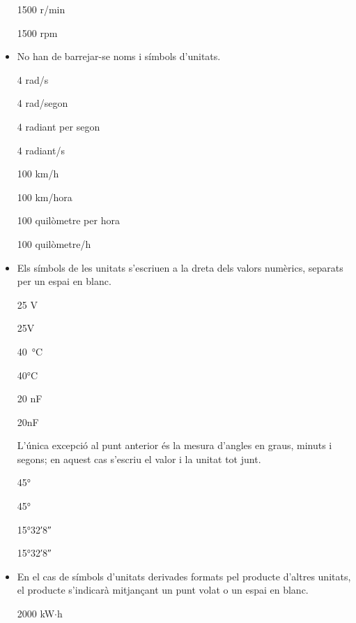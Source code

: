 \begin{itemize}
\textcolor{Green}\faCheckSquare{} 1500 r/min

\textcolor{Red}\faTimesCircle{} 1500 rpm

\item No han de barrejar-se noms i símbols d'unitats.

\textcolor{Green}\faCheckSquare{} 4 rad/s

\textcolor{Red}\faTimesCircle{} 4 rad/segon

\textcolor{Green}\faCheckSquare{} 4 radiant per segon

\textcolor{Red}\faTimesCircle{} 4 radiant/s

\textcolor{Green}\faCheckSquare{} 100 km/h

\textcolor{Red}\faTimesCircle{} 100 km/hora

\textcolor{Green}\faCheckSquare{} 100 quilòmetre per hora

\textcolor{Red}\faTimesCircle{} 100 quilòmetre/h


\item Els símbols de les unitats s'escriuen a la dreta dels valors
numèrics, separats per un espai en blanc.

\textcolor{Green}\faCheckSquare{} 25 V

\textcolor{Red}\faTimesCircle{} 25V

\textcolor{Green}\faCheckSquare{} \SI{40}{\degreeCelsius}

\textcolor{Red}\faTimesCircle{} 40\si{\degreeCelsius}

\textcolor{Green}\faCheckSquare{} 20 nF

\textcolor{Red}\faTimesCircle{} 20nF


 L'única excepció al punt anterior és la mesura d'angles en graus, minuts i segons; en aquest cas s'escriu el valor i la unitat tot junt.

\textcolor{Green}\faCheckSquare{} \ang{45}

\textcolor{Red}\faTimesCircle{} \ang[number-angle-product = \,]{45}

\textcolor{Green}\faCheckSquare{} \ang{15;32;8}

\textcolor{Red}\faTimesCircle{} \ang[number-angle-product = \,]{15;32;8}

\item En el cas de símbols d'unitats derivades formats pel producte
d'altres unitats, el producte s'indicarà mitjançant un punt volat o
un espai en blanc.

\textcolor{Green}\faCheckSquare{} 2000 kW$\cdot$h


\end{itemize}
